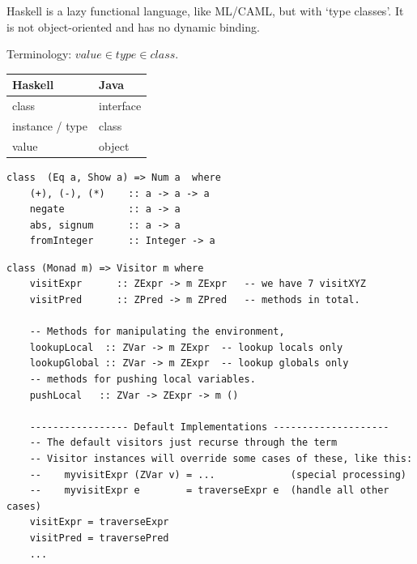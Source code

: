 \begin{slide}

Haskell is a lazy functional language, like ML/CAML,
but with `type classes'.  It is not object-oriented and
has no dynamic binding.

Terminology: $value \in type \in class$.\\
\begin{center}
\begin{tabular}{|l|l|}
  \hline
  Haskell                 & Java \\
  \hline
  [type] class            & interface \\
  instance / type         & class \\
  value                   & object \\
  \hline
\end{tabular}
\end{center}

\begin{small}
\begin{verbatim}
class  (Eq a, Show a) => Num a  where
    (+), (-), (*)    :: a -> a -> a
    negate           :: a -> a
    abs, signum      :: a -> a
    fromInteger      :: Integer -> a
\end{verbatim}
\end{small}
\end{slide}


\begin{slide}
{
\begin{verbatim}
class (Monad m) => Visitor m where
    visitExpr      :: ZExpr -> m ZExpr   -- we have 7 visitXYZ
    visitPred      :: ZPred -> m ZPred   -- methods in total.

    -- Methods for manipulating the environment,
    lookupLocal  :: ZVar -> m ZExpr  -- lookup locals only
    lookupGlobal :: ZVar -> m ZExpr  -- lookup globals only
    -- methods for pushing local variables.
    pushLocal   :: ZVar -> ZExpr -> m ()

    ----------------- Default Implementations --------------------
    -- The default visitors just recurse through the term
    -- Visitor instances will override some cases of these, like this:
    --    myvisitExpr (ZVar v) = ...             (special processing)
    --    myvisitExpr e        = traverseExpr e  (handle all other cases)
    visitExpr = traverseExpr
    visitPred = traversePred
    ... 
\end{verbatim}
}
\end{slide}


